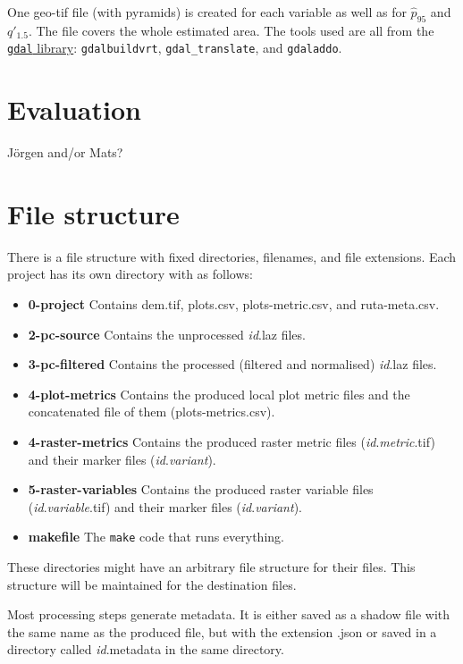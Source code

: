 \documentclass[english,a4paper,minion,nofigsidecaption]{article}
\newcommand{\file}[1]{\textsf{#1}}
\newcommand{\id}{\emph{id}}
\newcommand{\first}[1]{\ensuremath{\hat{#1}}}
\newcommand{\perc}[1]{\ensuremath{\first{p}_{#1}}}
\newcommand{\prop}[1]{\ensuremath{q'_{#1}}}
\begin{document}
One geo-tif file (with pyramids) is created for each variable as well as for \perc{95} and \prop{1.5}. The file covers the whole estimated area. 
The tools used are all from the \href{https://gdal.org}{\texttt{gdal} library}: \verb|gdalbuildvrt|, \verb|gdal_translate|, and \verb|gdaladdo|.


\newpage
\section{Evaluation}

Jörgen and/or Mats?




\section{File structure}

There is a file structure with fixed directories, filenames, and file extensions.
Each project has its own directory with as follows:
\begin{itemize}
	\item\file{\textbf{0-project}} Contains \file{dem.tif}, \file{plots.csv}, \file{plots-metric.csv}, and \file{ruta-meta.csv}.
	\item\file{\textbf{2-pc-source}} Contains the unprocessed \file{{\id}.laz} files.
	\item\file{\textbf{3-pc-filtered}} Contains the processed (filtered and normalised) \file{{\id}.laz} files.
	\item\file{\textbf{4-plot-metrics}} Contains the produced local plot metric files and the concatenated file of them (\file{plots-metrics.csv}). 
	\item\file{\textbf{4-raster-metrics}} Contains the produced raster metric files (\file{{\id}.\emph{metric}.tif}) and their marker files (\file{{\id}.\emph{variant}}). 
	\item\file{\textbf{5-raster-variables}} Contains the produced raster variable files (\file{{\id}.\emph{variable}.tif}) and their marker files (\file{{\id}.\emph{variant}}). 
	\item\file{\textbf{makefile}} The \texttt{make} code that runs everything. 
\end{itemize}
These directories might have an arbitrary file structure for their files. This structure will be maintained for the destination files. 

Most processing steps generate metadata. It is either saved as a shadow file with the same name as the produced file, but with the extension \file{.json} or saved in a directory called \file{{\id}.metadata} in the same directory. 
\end{document}
